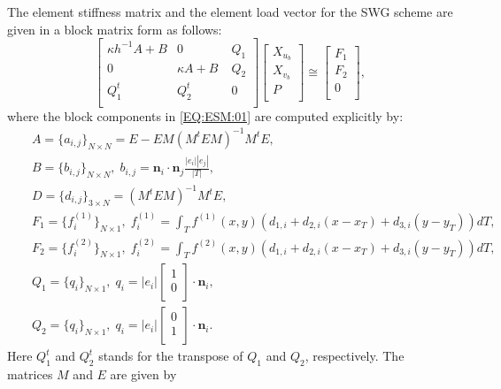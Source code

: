 \documentclass[final,leqno]{siamltex704}
\begin{document}
\begin{theorem}\label{THM:ESM}
The element stiffness matrix and the element load vector for the SWG scheme are given in a block matrix form as follows:
\begin{equation}\label{EQ:ESM:01}
\begin{bmatrix}
\kappa h^{-1} A + B & 0 & \; Q_1 \\
0      & \kappa A + B  & \; Q_2\\
Q_1^t & Q_2^t & \; 0 \\
\end{bmatrix}
\begin{bmatrix}
X_{{u}_b} \\
X_{{v}_b} \\
P \\
\end{bmatrix}
\cong \begin{bmatrix}
F_1 \\
F_2 \\
0 \\
\end{bmatrix},
\end{equation}
where the block components in \eqref{EQ:ESM:01} are computed explicitly by:
\begin{eqnarray*}
&&A=\{a_{i,j}\}_{N\times N} = E- EM(M^tEM)^{-1}M^tE, \\
&&B=\{b_{i,j}\}_{N\times N}, \; b_{i,j} = \bm{n}_i\cdot\bm{n}_j\displaystyle\frac{|e_i||e_j|}{|T|},\\
&&D=\{d_{i,j}\}_{3\times N}=(M^tEM)^{-1}M^tE,\\
&&F_1=\{f^{(1)}_{i}\}_{N\times 1}, \; \displaystyle f^{(1)}_{i} = \int_{T}f^{(1)}(x,y) (d_{1,i} + d_{2,i}(x-x_T) + d_{3,i}(y-y_T))dT,\\
&&F_2=\{f^{(2)}_{i}\}_{N\times 1}, \; \displaystyle f^{(2)}_{i} = \int_{T}f^{(2)}(x,y) (d_{1,i} + d_{2,i}(x-x_T) + d_{3,i}(y-y_T)) dT,\\
&&Q_1=\{q_{i}\}_{N\times 1}, \; q_{i} = |e_i|
\begin{bmatrix}
1 \\
0 \\
\end{bmatrix} \cdot \bm{n}_i,\\
&&Q_2=\{q_{i}\}_{N\times 1}, \; q_{i} = |e_i|
\begin{bmatrix}
0 \\
1 \\
\end{bmatrix} \cdot \bm{n}_i.
\end{eqnarray*}
Here $Q_1^t$ and $Q_2^t$ stands for the transpose of $Q_1$ and $Q_2$, respectively. The matrices $M$ and $E$ are given by

\end{theorem}
\end{document}

